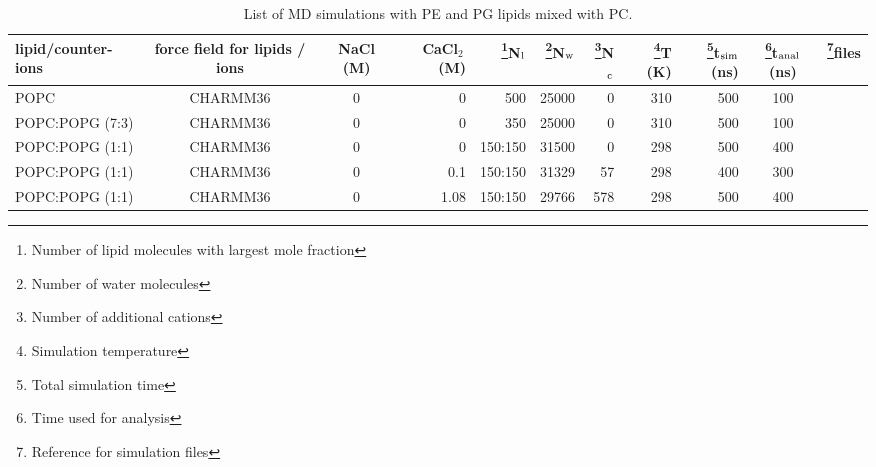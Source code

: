 \documentclass[journal=jpcbfk]{achemso}
\begin{document}
  \begin{sidewaystable*}[!p]
  \centering
  \caption{List of MD simulations with PE and PG lipids mixed with PC.
  }\label{systemsMIX}
  \begin{minipage}[t]{\textwidth}
    \begin{tabular}{l c c r r r r r r c c}
      lipid/counter-ions & force field for lipids / ions & NaCl (M) & CaCl$_2$\,(M) &  \footnote{Number of lipid molecules with largest mole fraction}N$_{\rm l}$   &  \footnote{Number of water molecules}N$_{\rm w}$   & \footnote{Number of additional cations}N$_{\rm c}$  & \footnote{Simulation temperature}T (K)  & \footnote{Total simulation time}t$_{{\rm sim}}$(ns) & \footnote{Time used for analysis}t$_{{\rm anal}}$ (ns) &   \footnote{Reference for simulation files}files\\
      \hline
      POPC                   & CHARMM36 \cite{??}        & 0         & 0  & 500     & 25000 & 0   &  310  & 500 & 100 & \cite{POPCcharmmT310K}  \\
      POPC:POPG (7:3)        & CHARMM36 \cite{??}        & 0         & 0  & 350     & 25000 & 0   &  310  & 500 & 100 & \cite{POPC7POPG1charmm36}  \\
      POPC:POPG (1:1)        & CHARMM36 \cite{??}        &0          & 0  & 150:150 & 31500 & 0   &  298  & 500 & 400 & \cite{CHARMM36POPCPOPG5050} \\ 
      POPC:POPG (1:1)        & CHARMM36 \cite{??}        &0          & 0.1 & 150:150 & 31329 & 57 &  298  & 400 & 300 & \cite{CHARMM36POPCPOPG5050100mMCaCl} \\
      POPC:POPG (1:1)        & CHARMM36 \cite{??}        &0          & 1.08 & 150:150 & 29766 & 578  &  298  & 500 & 400 & \cite{CHARMM36POPCPOPG50501000mMCaCl} \\

\end{tabular}
\end{minipage}
\end{sidewaystable*}
\end{document}
